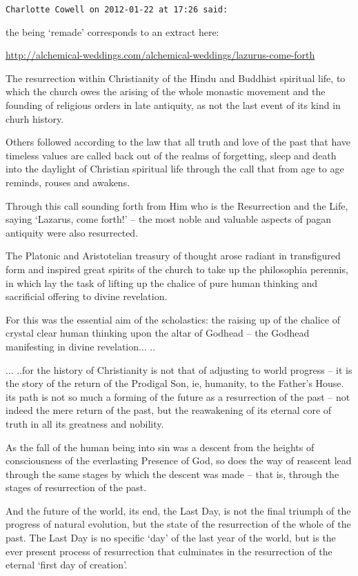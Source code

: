 \begin{footnotesize}
\begin{sffamily}
\hfill

\texttt{Charlotte Cowell on 2012-01-22 at 17:26 said:}

the being `remade' corresponds to an extract here:

\url{http://alchemical-weddings.com/alchemical-weddings/lazurus-come-forth}


The resurrection within Christianity of the Hindu and Buddhist spiritual life, to which the church owes the arising of the whole monastic movement and the founding of religious orders in late antiquity, as not the last event of its kind in churh history.

Others followed according to the law that all truth and love of the past that have timeless values are called back out of the realms of forgetting, sleep and death into the daylight of Christian spiritual life through the call that from age to age reminds, rouses and awakens.

Through this call sounding forth from Him who is the Resurrection and the Life, saying `Lazarus, come forth!' -- the most noble and valuable aspects of pagan antiquity were also resurrected.

The Platonic and Aristotelian treasury of thought arose radiant in transfigured form and inspired great spirits of the church to take up the philosophia perennis, in which lay the task of lifting up the chalice of pure human thinking and sacrificial offering to divine revelation.

For this was the essential aim of the scholastics: the raising up of the chalice of crystal clear human thinking upon the altar of Godhead -- the Godhead manifesting in divine revelation... ..

... ..for the history of Christianity is not that of adjusting to world progress -- it is the story of the return of the Prodigal Son, ie, humanity, to the Father's House. its path is not so much a forming of the future as a resurrection of the past -- not indeed the mere return of the past, but the reawakening of its eternal core of truth in all its greatness and nobility.

As the fall of the human being into sin was a descent from the heights of consciousness of the everlasting Presence of God, so does the way of reascent lead through the same stages by which the descent was made -- that is, through the stages of resurrection of the past.

And the future of the world, its end, the Last Day, is not the final triumph of the progress of natural evolution, but the state of the resurrection of the whole of the past. The Last Day is no specific `day' of the last year of the world, but is the ever present process of resurrection that culminates in the resurrection of the eternal `first day of creation'.


\end{sffamily}
\end{footnotesize}
